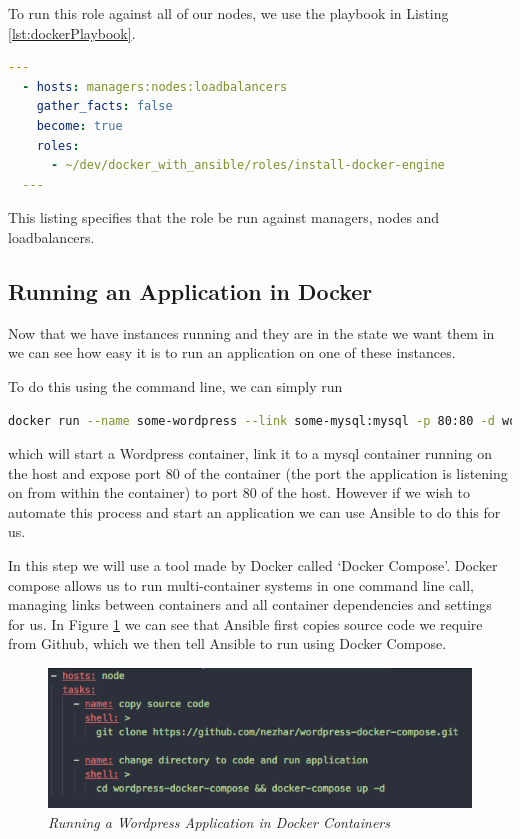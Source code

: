 \documentclass{article}
\begin{document}
To run this role against all of our nodes, we use the playbook in Listing \ref{lst:dockerPlaybook}.

\begin{lstlisting}[float,floatplacement=!htbp,language=yaml,caption={install-docker-engine.yml},label={lst:dockerPlaybook},basicstyle=\scriptsize]
  ---
  - hosts: managers:nodes:loadbalancers
    gather_facts: false
    become: true
    roles:
      - ~/dev/docker_with_ansible/roles/install-docker-engine
  ---
\end{lstlisting}

This listing specifies that the role be run against managers, nodes and loadbalancers.


\newpage
\subsection{Running an Application in Docker}
\label{subs:running_in_docker}
Now that we have instances running and they are in the state we want them in we can see how easy it is to run an application on one of these instances.

To do this using the command line, we can simply run 

\begin{lstlisting}[language=bash]
  docker run --name some-wordpress --link some-mysql:mysql -p 80:80 -d wordpress
\end{lstlisting}

which will start a Wordpress container, link it to a mysql container running on the host and expose port 80 of the container (the port the application is listening on from within the container) to port 80 of the host. However if we wish to automate this process and start an application we can use Ansible to do this for us.

In this step we will use a tool made by Docker called `Docker Compose'. Docker compose allows us to run multi-container systems in one command line call, managing links between containers and all container dependencies and settings for us. In Figure \ref{fig:run_app} we can see that Ansible first copies source code we require from Github, which we then tell Ansible to run using Docker Compose. 

\begin{figure}[!h]
\centering
\includegraphics*[width=\textwidth]{components/images/run_app}
\caption{\em Running a Wordpress Application in Docker Containers}
\label{fig:run_app}
\end{figure}
\end{document}
